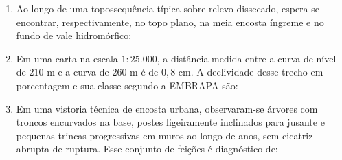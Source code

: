 \begin{enumerate}[leftmargin=1.8em, itemsep=5pt, resume]
  \item Ao longo de uma topossequência típica sobre relevo dissecado, espera-se encontrar, respectivamente, no topo plano, na meia encosta íngreme e no fundo de vale hidromórfico:

  \item Em uma carta na escala $1{:}25.000$, a distância medida entre a curva de nível de $210\text{ m}$ e a curva de $260\text{ m}$ é de $0{,}8\text{ cm}$. A declividade desse trecho em porcentagem e sua classe segundo a EMBRAPA são:

  \item Em uma vistoria técnica de encosta urbana, observaram-se árvores com troncos encurvados na base, postes ligeiramente inclinados para jusante e pequenas trincas progressivas em muros ao longo de anos, sem cicatriz abrupta de ruptura. Esse conjunto de feições é diagnóstico de:


\end{enumerate}
